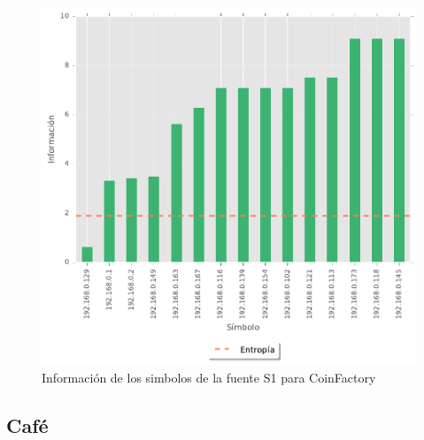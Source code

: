 \begin{figure}[htb]
	\centering
	
\end{figure}

\begin{figure}
  \begin{center}
    \includegraphics[scale = 0.5]{img/Pyme-information-S1.pdf}
    \caption{Información de los simbolos de la fuente S1 para CoinFactory}
    \label{informacion_pyme}
  \end{center}
\end{figure}

\subsection*{\textbf{Café}}


